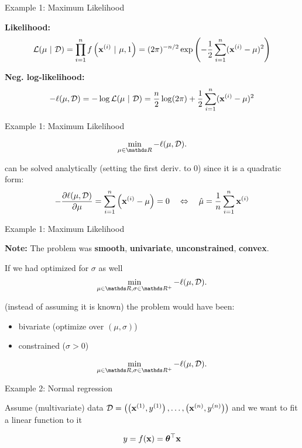 \documentclass[11pt,compress,t,notes=noshow, xcolor=table]{beamer}
\begin{document}
\begin{framei}{Example 1: Maximum Likelihood}
\item \textbf{Likelihood:}
$$ \mathcal{L}(\mu~|~\mathcal{D})= \prod_{i=1}^{n} f\left(\mathbf{x}^{(i)}~|~\mu, 1\right) = (2\pi)^{-n/2}\exp\left(-\frac{1}{2} \sum_{i=1}^{n} (\mathbf{x}^{(i)}-\mu)^{2} \right) $$
\item \textbf{Neg. log-likelihood:}
$$ - \ell(\mu, \mathcal{D}) = - \log \mathcal{L}(\mu~|~\mathcal{D}) = \frac{n}{2} \log(2\pi) + \frac{1}{2} \sum_{i=1}^{n} (\mathbf{x}^{(i)}-\mu)^{2} $$
\end{framei}


\begin{framei}{Example 1: Maximum Likelihood}
\item[] $$ \min_{\mu \in \R} - \ell(\mu, \D). $$
\item can be solved analytically (setting the first deriv. to $0$) since it is a quadratic form:
$$ -\frac{\partial \ell(\mu, \mathcal{D})}{\partial \mu} = \sum\limits_{i=1}^n \left(\mathbf{x}^{(i)} - \mu\right) = 0 \quad \Leftrightarrow \quad \hat \mu = \frac{1}{n} \sum\limits_{i=1}^n \mathbf{x}^{(i)} $$
\end{framei}


\begin{framei}[sep=L]{Example 1: Maximum Likelihood}
\item \textbf{Note: } The problem was \textbf{smooth}, \textbf{univariate}, \textbf{unconstrained}, \textbf{convex}.
\item If we had optimized for $\sigma$ as well
$$ \min_{\mu \in \R, \sigma \in \R^+} - \ell(\mu, \D). $$
\item (instead of assuming it is known) the problem would have been:
\begin{itemize}
\item bivariate (optimize over $(\mu, \sigma)$)
\item constrained ($\sigma > 0$)
\end{itemize}
$$ \min_{\mu \in \R, \sigma \in \R^+} - \ell(\mu, \D). $$
\end{framei}


\begin{framei}{Example 2: Normal regression}
\item Assume (multivariate) data $\mathcal{D} = \left( \left(\mathbf{x}^{(1)}, y^{(1)}\right), \ldots, \left(\mathbf{x}^{(n)}, y^{(n)}\right)\right)$ and we want to fit a linear function to it
\item[] $$ y = f(\mathbf{x}) = \bm{\theta}^\top \mathbf{x} $$
\vfill
{}
\end{framei}
\end{document}
